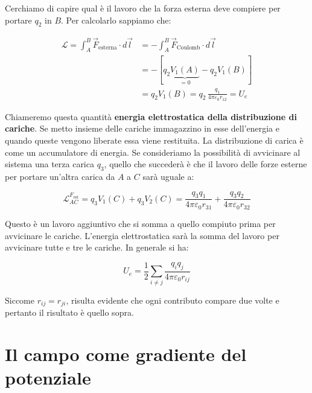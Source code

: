 \begin{figure}[htpb]
\end{figure}
\FloatBarrier

Cerchiamo di capire qual è il lavoro che la forza esterna deve compiere per portare $q_2$ in $B$. Per calcolarlo sappiamo che:

\begin{align*}
	\mathcal{L} = \int_A^B \vec{F}_{\text{esterna}} \cdot d\vec{l} &= - \int_A^B \vec{F}_{\text{Coulomb}} \cdot d\vec{l} \\
	&= - [ q_2 \underbrace{V_1(A)}_{=0} - q_2V_1(B) ] \\
	&= q_2 V_1(B) = q_2 \, \frac{q_1}{4\pi \varepsilon_0 r_{12}} = U_e
\end{align*}

Chiameremo questa quantità \textbf{energia elettrostatica della distribuzione di cariche}. Se metto insieme delle cariche immagazzino in esse dell'energia e quando queste vengono liberate essa viene restituita. La distribuzione di carica è come un accumulatore di energia.
Se consideriamo la possibilità di avvicinare al sistema una terza carica $q_3$, quello che succederà è che il lavoro delle forze esterne per portare un'altra carica da $A$ a $C$ sarà uguale a:

\[
	\mathcal{L}_{AC}^{F_{\text{est}}}  = q_3 V_1(C) + q_3V_2(C) = \frac{q_3q_1}{4\pi \varepsilon_0 r_{31}} + \frac{q_3q_2}{4\pi \varepsilon_0 r_{32}}
\]

Questo è un lavoro aggiuntivo che si somma a quello compiuto prima per avvicinare le cariche. L'energia elettrostatica sarà la somma del lavoro per avvicinare tutte e tre le cariche.
In generale si ha:

\[
	\boxed{U_e = \frac{1}{2} \sum_{i\neq j} \frac{q_iq_j}{4\pi \varepsilon_0 r_{ij}}}
\]

Siccome $r_{ij} = r_{ji}$, risulta evidente che ogni contributo compare due volte e pertanto il risultato è quello sopra.

\section{Il campo come gradiente del potenziale}

